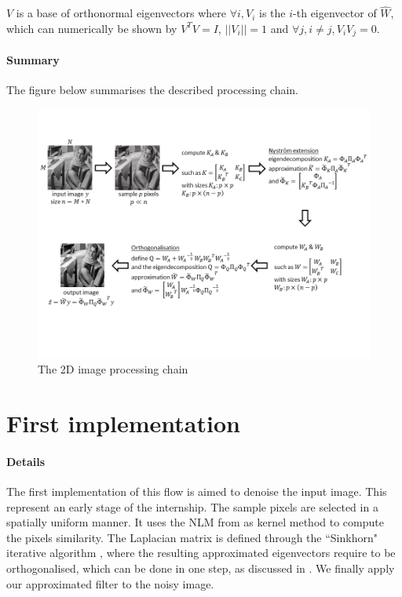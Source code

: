 \(V\) is a base of orthonormal eigenvectors where \(\forall i, V_i\) is the \(i\)-th eigenvector of \(\hat{W}\), which can numerically be shown by \(V^T V = I\), \(||V_i|| = 1\) and \(\forall j, i \neq j, V_i V_j = 0\).

\paragraph{Summary}

The figure below summarises the described processing chain.

\begin{figure}[H]
    \centering
    \includegraphics[width=1.2\textwidth]{img/processingChain.png}
    \caption{The 2D image processing chain}
\end{figure}

\section{First implementation}

\paragraph{Details}
The first implementation of this flow is aimed to denoise the input image.
This represent an early stage of the internship.
The sample pixels are selected in a spatially uniform manner.
It uses the NLM from \cite{buades_review_2005} as kernel method to compute the pixels similarity.
The Laplacian matrix is defined through the ``Sinkhorn" iterative algorithm \cite{milanfar_symmetrizing_2013}, where the resulting approximated eigenvectors require to be orthogonalised, which can be done in one step, as discussed in \cite{fowlkes_spectral_2004}.
We finally apply our approximated filter to the noisy image.

